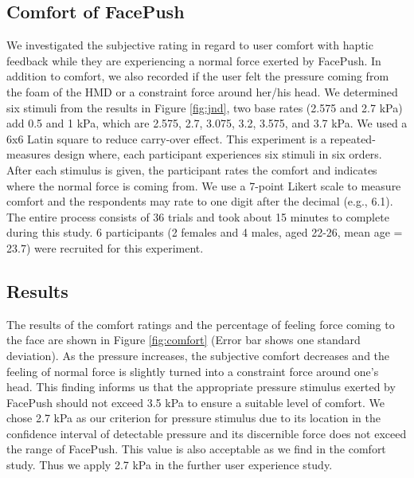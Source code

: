 \subsection{Comfort of FacePush }
We investigated the subjective rating in regard to user comfort with haptic feedback while they are experiencing a normal force exerted by FacePush. In addition to comfort, we also recorded if the user felt the pressure coming from the foam of the HMD or a constraint force around her/his head. We determined six stimuli from the results in Figure \ref{fig:jnd}, two base rates (2.575 and 2.7 kPa) add 0.5 and 1 kPa, which are 2.575, 2.7, 3.075, 3.2, 3.575, and 3.7 kPa. We used a 6x6 Latin square to reduce carry-over effect. This experiment is a repeated-measures design where, each participant experiences six stimuli in six orders. 
After each stimulus is given, the participant rates the comfort and indicates where the normal force is coming from. We use a 7-point Likert scale to measure comfort and the respondents may rate to one digit after the decimal (e.g., 6.1). The entire process consists of 36 trials and took about 15 minutes to complete during this study. 6 participants (2 females and 4 males, aged 22-26, mean age = 23.7) were recruited for this experiment. 

\subsection{Results }
The results of the comfort ratings and the percentage of feeling force coming to the face are shown in Figure \ref{fig:comfort} (Error bar shows one standard deviation). As the pressure increases, the subjective comfort decreases and the feeling of normal force is slightly turned into a constraint force around one's head. This finding informs us that the appropriate pressure stimulus exerted by FacePush should not exceed 3.5 kPa to ensure a suitable level of comfort. We chose 2.7 kPa as our criterion for pressure stimulus due to its location in the confidence interval of detectable pressure and its discernible force does not exceed the range of FacePush. This value is also acceptable as we find in the comfort study. Thus we apply 2.7 kPa in the further user experience study.

